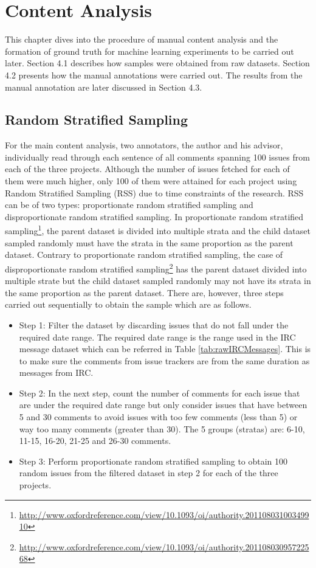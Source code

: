 \documentclass[a4paper,12pt,twoside]{report}
\begin{document}

\chapter{Content Analysis}

This chapter dives into the procedure of manual content analysis and the formation of ground truth for machine learning experiments to be carried out later. Section 4.1 describes how samples were obtained from raw datasets. Section 4.2 presents how the manual annotations were carried out. The results from the manual annotation are later discussed in Section 4.3.

\section{Random Stratified Sampling}
For the main content analysis, two annotators, the author and his advisor, individually read through each sentence of all comments spanning 100 issues from each of the three projects. Although the number of issues fetched for each of them were much higher, only 100 of them were attained for each project using Random Stratified Sampling (RSS) due to time constraints of the research. RSS can be of two types: proportionate random stratified sampling and disproportionate random stratified sampling. In proportionate random stratified sampling\footnote{\url{http://www.oxfordreference.com/view/10.1093/oi/authority.20110803100349910}}, the parent dataset is divided into multiple strata and the child dataset sampled randomly must have the strata in the same proportion as the parent dataset. Contrary to proportionate random stratified sampling, the case of disproportionate random stratified sampling\footnote{\url{http://www.oxfordreference.com/view/10.1093/oi/authority.20110803095722568}} has the parent dataset divided into multiple strate but the child dataset sampled randomly may not have its strata in the same proportion as the parent dataset. There are, however, three steps carried out sequentially to obtain the sample which are as follows.
\newline 
\begin{itemize}
\item {Step 1:} Filter the dataset by discarding issues that do not fall under the required date range. The required date range is the range used in the \acs{IRC} message dataset which can be referred in Table \ref{tab:rawIRCMessages}. This is to make sure the comments from issue trackers are from the same duration as messages from \acs{IRC}. 
\item {Step 2:} In the next step, count the number of comments for each issue that are under the required date range but only consider issues that have between 5 and 30 comments to avoid issues with too few comments (less than 5) or way too many comments (greater than 30). The 5 groups (stratas) are: 6-10, 11-15, 16-20, 21-25 and 26-30 comments.
\item {Step 3:} Perform proportionate random stratified sampling to obtain 100 random issues from the filtered dataset in step 2 for each of the three projects. 
\end{itemize}
\end{document}
